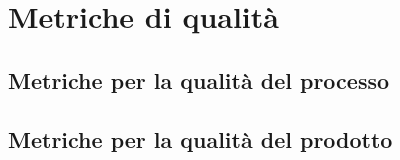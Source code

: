 \appendix
\section{Metriche di qualità}

\subsection{Metriche per la qualità del processo}

\subsection{Metriche per la qualità del prodotto}

